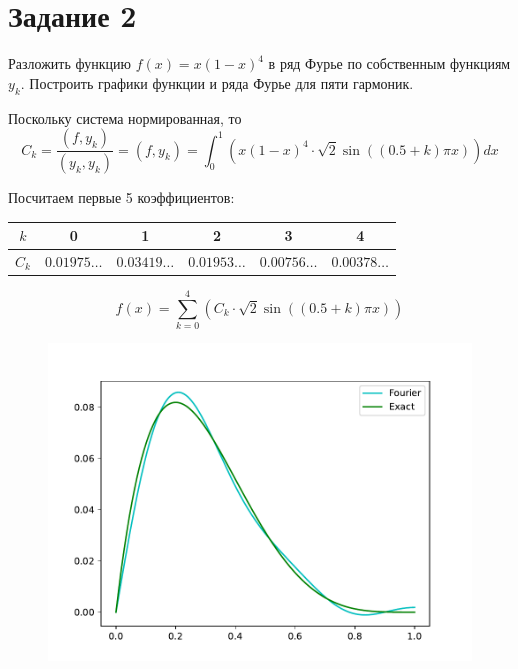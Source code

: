 \section*{Задание 2}
    Разложить функцию $ f(x) = x (1-x) ^4 $ в ряд Фурье по собственным функциям $ y_k $. Построить графики функции и ряда Фурье для пяти гармоник.

    Поскольку система нормированная, то
    \[ C_k = \frac{(f, y_k)}{(y_k, y_k)} = (f, y_k) = \int_0^1 \left( x (1-x) ^4 \cdot \sqrt{2} \sin \left( (0.5 + k) \pi x \right) \right) dx \]

    Посчитаем первые 5 коэффициентов:

    \begin{center}

        \begin{tabular}{|c|c|c|c|c|c|}
            \hline
            $ k $ & 0 & 1 & 2 & 3 & 4 \\
            \hline
            $ C_k $& $0.01975 \dots$& $0.03419 \dots$ & $0.01953 \dots$ & $0.00756 \dots$ & $0.00378 \dots$\\
            \hline
        \end{tabular}

    \end{center}
    \[
        f(x) = \sum_{k=0}^4 \left( C_k \cdot \sqrt{2} \sin \left( (0.5 + k) \pi x \right) \right)
    \]
    \begin{figure}[H]
        \centering
        \includegraphics[width=14cm]{fourier.pdf}
    \end{figure}
